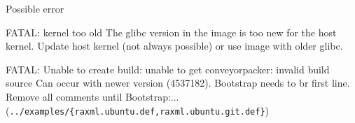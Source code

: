 \documentclass{beamer}
\newcommand{\tty}[1]{\texttt{#1}\xspace}
\begin{document}
  \begin{frame}{Possible error}
    \begin{block}{FATAL: kernel too old}
      The glibc version in the image is too new for the host kernel.
      Update host kernel (not always possible) or use image with
      older glibc.
    \end{block}
    \begin{block}{FATAL: Unable to create build: unable to get conveyorpacker: invalid build source}
      Can occur with newer version (4537182). Bootstrap needs to br first line.
      Remove all comments until Bootstrap:...\\
      (\tty{../examples/\{raxml.ubuntu.def,raxml.ubuntu.git.def\}})
    \end{block}
  \end{frame}
\end{document}
